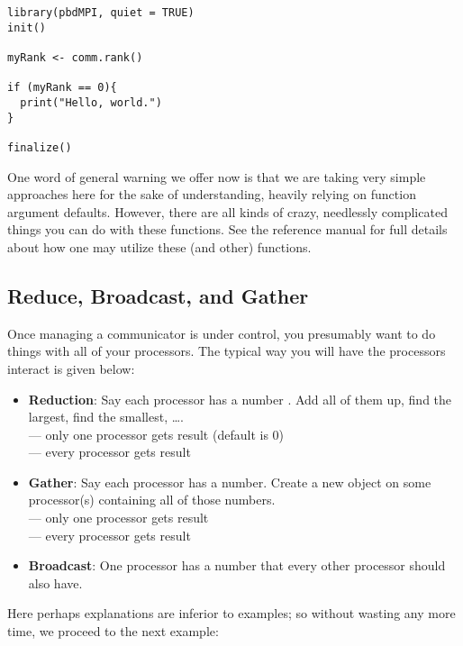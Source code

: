 \begin{lstlisting}[language=rr,title=Simple pbdMPI Example 1.5]
library(pbdMPI, quiet = TRUE)
init()

myRank <- comm.rank()

if (myRank == 0){
  print("Hello, world.")
}

finalize()
\end{lstlisting}

One word of general warning we offer now is that we are taking very simple approaches here for the sake of understanding, heavily relying on function argument defaults.  However, there are all kinds of crazy, needlessly complicated things you can do with these functions.  See the  reference manual for full details about how one may utilize these (and other)  functions.



\subsection{Reduce, Broadcast, and Gather}

Once managing a communicator is under control, you presumably want to do things with all of your processors.  The typical way you will have the processors interact is given below:

\begin{itemize}
  \item \textbf{Reduction}:  Say each processor has a number . Add all of them up, find the largest, find the smallest, \dots .\\
   --- only one processor gets result (default is 0)\\
   --- every processor gets result
  \item \textbf{Gather}: Say each processor has a number. Create a new object on some processor(s) containing all of those numbers.\\
   --- only one processor gets result\\
   --- every processor gets result
  \item \textbf{Broadcast}: One processor has a number  that every other processor should also have.\\
\end{itemize}

Here perhaps explanations are inferior to examples; so without wasting any more time, we proceed to the next example:

